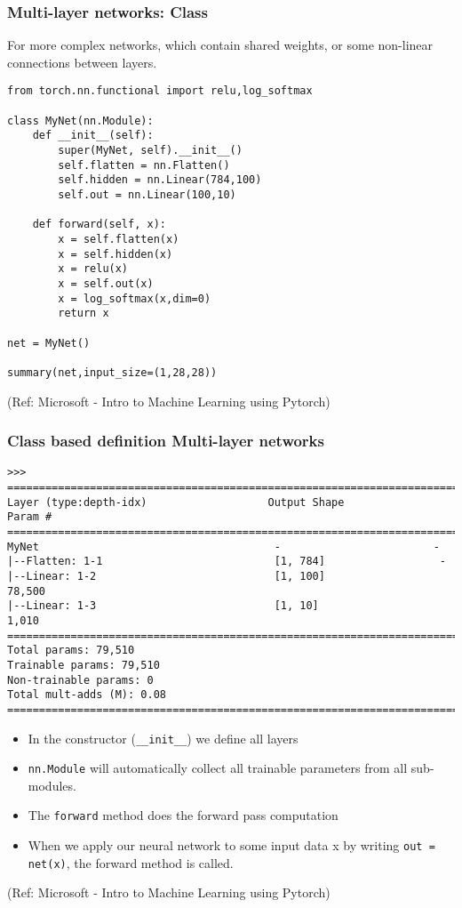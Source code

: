 \begin{frame}[fragile] \frametitle{Multi-layer networks: Class}

For more complex networks, which contain shared weights, or some non-linear connections between layers.

\begin{lstlisting}
from torch.nn.functional import relu,log_softmax

class MyNet(nn.Module):
    def __init__(self):
        super(MyNet, self).__init__()
        self.flatten = nn.Flatten()
        self.hidden = nn.Linear(784,100)
        self.out = nn.Linear(100,10)

    def forward(self, x):
        x = self.flatten(x)
        x = self.hidden(x)
        x = relu(x)
        x = self.out(x)
        x = log_softmax(x,dim=0)
        return x

net = MyNet()

summary(net,input_size=(1,28,28))
\end{lstlisting}


\tiny{(Ref: Microsoft - Intro to Machine Learning using Pytorch)}
\end{frame}

\begin{frame}[fragile] \frametitle{Class based definition Multi-layer networks}
\begin{lstlisting}
>>>
==========================================================================
Layer (type:depth-idx)                   Output Shape              Param #
==========================================================================
MyNet                                     -                        -
|--Flatten: 1-1                           [1, 784]                  -
|--Linear: 1-2                            [1, 100]                  78,500
|--Linear: 1-3                            [1, 10]                   1,010
==========================================================================
Total params: 79,510
Trainable params: 79,510
Non-trainable params: 0
Total mult-adds (M): 0.08
==========================================================================
\end{lstlisting}

\begin{itemize}
\item In the constructor (\lstinline|__init__|) we define all layers
\item \lstinline|nn.Module| will automatically collect all trainable parameters from all sub-modules.
\item The \lstinline|forward| method does the forward pass computation 
\item When we apply our neural network to some input data x by writing \lstinline|out = net(x)|, the forward method is called.
\end{itemize}

\tiny{(Ref: Microsoft - Intro to Machine Learning using Pytorch)}
\end{frame}


